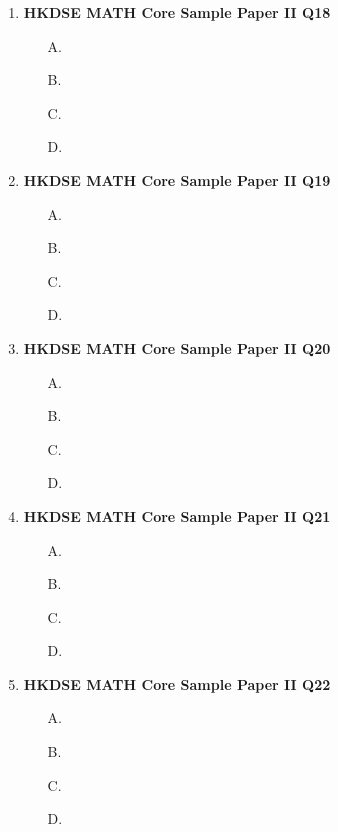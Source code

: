 \documentclass[12pt]{article}
\begin{document}
\begin{enumerate}
	\item \textbf{HKDSE MATH Core Sample Paper II Q18}\\
	
	\begin{enumerate}
		\item[A.]
		\item[B.]
		\item[C.]
		\item[D.]
	\end{enumerate}

	\item \textbf{HKDSE MATH Core Sample Paper II Q19}\\
	
	\begin{enumerate}
		\item[A.]
		\item[B.]
		\item[C.]
		\item[D.]
	\end{enumerate}

	\item \textbf{HKDSE MATH Core Sample Paper II Q20}\\
	
	\begin{enumerate}
		\item[A.]
		\item[B.]
		\item[C.]
		\item[D.]
	\end{enumerate}

	\item \textbf{HKDSE MATH Core Sample Paper II Q21}\\
	
	\begin{enumerate}
		\item[A.]
		\item[B.]
		\item[C.]
		\item[D.]
	\end{enumerate}

	\item \textbf{HKDSE MATH Core Sample Paper II Q22}\\
	
	\begin{enumerate}
		\item[A.]
		\item[B.]
		\item[C.]
		\item[D.]
	\end{enumerate}


\end{enumerate}
\end{document}
